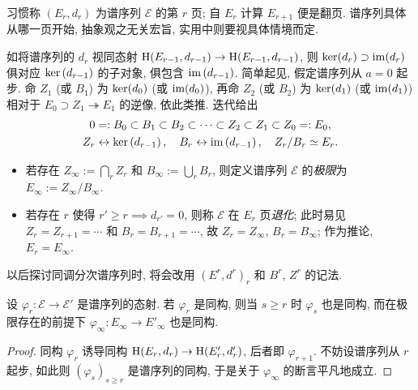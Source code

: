 习惯称 $(E_r, d_r)$ 为谱序列 $\mathscr{E}$ 的第 $r$ 页; 自 $E_r$ 计算 $E_{r+1}$ 便是翻页. 谱序列具体从哪一页开始, 抽象观之无关宏旨, 实用中则要视具体情境而定.

如将谱序列的 $d_r$ 视同态射 $\operatorname{H}(E_{r-1}, d_{r-1}) \to \operatorname{H}(E_{r-1}, d_{r-1})$, 则 $\operatorname{ker}(d_r) \supset \operatorname{im}(d_r)$ 俱对应 $\operatorname{ker}\left(d_{r-1} \right)$ 的子对象, 俱包含 $\operatorname{im}\left( d_{r-1} \right)$. 简单起见, 假定谱序列从 $a=0$ 起步. 命 $Z_1$ (或 $B_1$) 为 $\operatorname{ker}(d_0)$ (或 $\operatorname{im}(d_0)$), 再命 $Z_2$ (或 $B_2$) 为 $\operatorname{ker}(d_1)$ (或 $\operatorname{im}(d_1)$) 相对于 $E_0 \supset Z_1 \twoheadrightarrow E_1$ 的逆像, 依此类推. 迭代给出
\begin{equation}\label{eqn:spectral-sequence-Z-B}\begin{gathered}
	0 =: B_0 \subset B_1 \subset B_2 \subset \cdots \subset Z_2 \subset Z_1 \subset Z_0 =: E_0, \\
	Z_r \leftrightarrow \operatorname{ker}\left( d_{r-1} \right), \quad B_r \leftrightarrow \operatorname{im}\left( d_{r-1} \right), \quad Z_r/B_r \simeq E_r.
\end{gathered}\end{equation}

\begin{itemize}
	\item 若存在 $Z_\infty := \bigcap_r Z_r$ 和 $B_\infty := \bigcup_r B_r$, 则定义谱序列 $\mathscr{E}$ 的\emph{极限}为 $E_\infty := Z_\infty / B_\infty$.
	\item 若存在 $r$ 使得 $r' \geq r \implies d_{r'} = 0$, 则称 $\mathscr{E}$ 在 $E_r$ 页\emph{退化}; 此时易见 $Z_r = Z_{r+1} = \cdots$ 和 $B_r = B_{r+1} = \cdots$, 故 $Z_r = Z_\infty$, $B_r = B_\infty$; 作为推论, $E_r = E_\infty$. 
\end{itemize}

以后探讨同调分次谱序列时, 将会改用 $(E^r, d^r)_r$ 和 $B^r$, $Z^r$ 的记法.

\begin{proposition}\label{prop:ss-isom-infty}
	设 $\varphi_r: \mathscr{E} \to \mathscr{E}'$ 是谱序列的态射. 若 $\varphi_r$ 是同构, 则当 $s \geq r$ 时 $\varphi_s$ 也是同构, 而在极限存在的前提下 $\varphi_\infty: E_\infty \to E'_\infty$ 也是同构.
\end{proposition}
\begin{proof}
	同构 $\varphi_r$ 诱导同构 $\operatorname{H}(E_r, d_r) \to \operatorname{H}(E'_r, d'_r)$, 后者即 $\varphi_{r+1}$. 不妨设谱序列从 $r$ 起步, 如此则 $(\varphi_s)_{s \geq r}$ 是谱序列的同构, 于是关于 $\varphi_\infty$ 的断言平凡地成立.
\end{proof}

